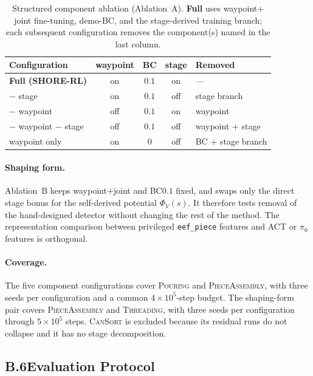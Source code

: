 \documentclass[letterpaper]{article} %
\begin{document}
\begin{table}[t]
\centering\small\setlength{\tabcolsep}{4pt}
\begin{tabular}{@{}lcccl@{}}
\toprule
Configuration & waypoint & BC & stage & Removed \\
\midrule
\textbf{Full (SHORE-RL)} & on  & $0.1$ & on  & --- \\
$-$ stage                & on  & $0.1$ & off & stage branch \\
$-$ waypoint             & off & $0.1$ & on  & waypoint \\
$-$ waypoint $-$ stage   & off & $0.1$ & off & waypoint $+$ stage \\
waypoint only             & on  & $0$   & off & BC $+$ stage branch \\
\bottomrule
\end{tabular}
\caption{Structured component ablation (Ablation~A). \textbf{Full} uses
waypoint$+$joint fine-tuning, demo-BC, and the stage-derived training branch;
each subsequent configuration removes the component(s) named in the last
column.}
\label{tab:simarms}
\end{table}

\paragraph{Shaping form.}
Ablation~B keeps waypoint$+$joint and BC$0.1$ fixed, and swaps only the direct stage
bonus for the self-derived potential $\Phi_V(s)$. It therefore tests removal of the
hand-designed detector without changing the rest of the method. The representation
comparison between privileged \texttt{eef\_piece} features and ACT or $\pi_0$ features
is orthogonal.

\paragraph{Coverage.}
The five component configurations cover \textsc{Pouring} and
\textsc{PieceAssembly}, with three seeds per configuration and a common
$4{\times}10^5$-step budget. The shaping-form pair covers
\textsc{PieceAssembly} and \textsc{Threading}, with three seeds per
configuration through $5{\times}10^5$ steps. \textsc{CanSort} is excluded
because its residual runs do not collapse and it has no stage decomposition.

\subsection{B.6\quad Evaluation Protocol}
\end{document}
